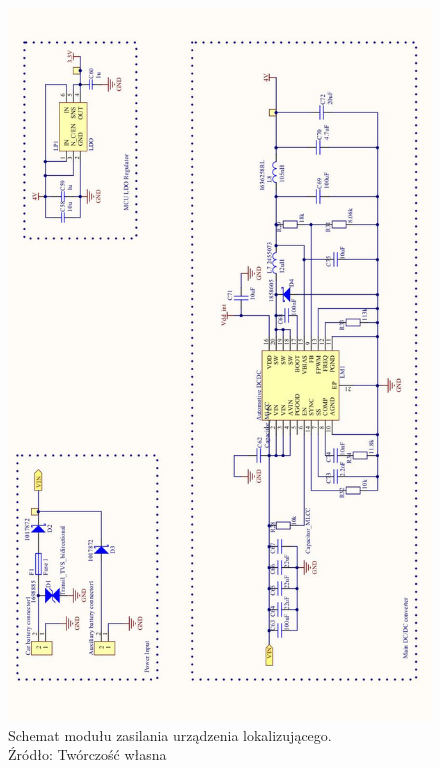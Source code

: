 \begin{figure}[H]
	\centering
	\includegraphics[width=14cm]{img/schematics/mainboard_power.jpg}
	\caption{Schemat modułu zasilania urządzenia lokalizującego. \\ Źródło: Twórczość własna}
	\label{fig:image_mainboard_power_schematic}
\end{figure}

